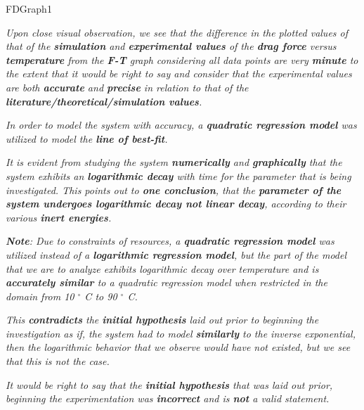 
{FDGraph1}            
            
\textit{Upon close visual observation, we see that the difference in the plotted values of that of the \textbf{simulation} and \textbf{experimental values} of the \textbf{drag force} versus \textbf{temperature} from the \textbf{F-T} graph considering all data points are very \textbf{minute} to the extent that it would be right to say and consider that the experimental values are both \textbf{accurate} and \textbf{precise} in relation to that of the \textbf{literature/theoretical/simulation values}.}

\textit{In order to model the system with accuracy, a \textbf{quadratic regression model} was utilized to model the \textbf{line of best-fit}.}
        
\textit{It is evident from studying the system \textbf{numerically} and \textbf{graphically} that the system exhibits an \textbf{logarithmic decay} with time for the parameter that is being investigated. This points out to \textbf{one conclusion}, that the \textbf{parameter of the system undergoes logarithmic decay not linear decay}, according to their various \textbf{inert energies}.}

\textit{\textbf{Note}: Due to constraints of resources, a \textbf{quadratic regression model} was utilized instead of a \textbf{logarithmic regression model}, but the part of the model that we are to analyze exhibits logarithmic decay over temperature and is \textbf{accurately similar} to a quadratic regression model when restricted in the domain from 10 $^\circ$ C to 90 $^\circ$ C.}
	 
\textit{This \textbf{contradicts} the \textbf{initial hypothesis} laid out prior to beginning the investigation as if, the system had to model \textbf{similarly} to the inverse exponential, then the logarithmic behavior that we observe would have not existed, but we see that this is not the case.}        
        

\textit{It would be right to say that the \textbf{initial hypothesis} that was laid out prior, beginning the experimentation was \textbf{incorrect} and is \textbf{not} a valid statement.}        
    
    

